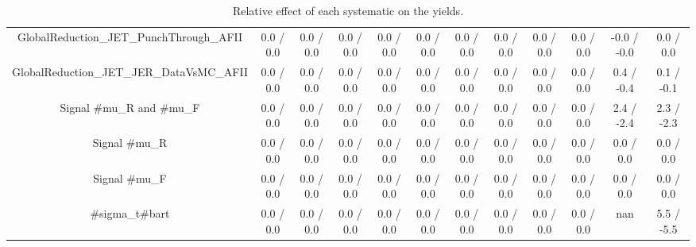 \begin{table}[htbp]
\begin{center}
\begin{tabular}{|c|c|c|c|c|c|c|c|c|c|c|c|}
  GlobalReduction_JET_PunchThrough_AFII & 0.0 / 0.0 & 0.0 / 0.0 & 0.0 / 0.0 & 0.0 / 0.0 & 0.0 / 0.0 & 0.0 / 0.0 & 0.0 / 0.0 & 0.0 / 0.0 & 0.0 / 0.0 & -0.0 / -0.0 & 0.0 / 0.0 \\ 
  GlobalReduction_JET_JER_DataVsMC_AFII & 0.0 / 0.0 & 0.0 / 0.0 & 0.0 / 0.0 & 0.0 / 0.0 & 0.0 / 0.0 & 0.0 / 0.0 & 0.0 / 0.0 & 0.0 / 0.0 & 0.0 / 0.0 & 0.4 / -0.4 & 0.1 / -0.1 \\ 
  Signal #mu_{R} and #mu_{F} & 0.0 / 0.0 & 0.0 / 0.0 & 0.0 / 0.0 & 0.0 / 0.0 & 0.0 / 0.0 & 0.0 / 0.0 & 0.0 / 0.0 & 0.0 / 0.0 & 0.0 / 0.0 & 2.4 / -2.4 & 2.3 / -2.3 \\ 
  Signal #mu_{R} & 0.0 / 0.0 & 0.0 / 0.0 & 0.0 / 0.0 & 0.0 / 0.0 & 0.0 / 0.0 & 0.0 / 0.0 & 0.0 / 0.0 & 0.0 / 0.0 & 0.0 / 0.0 & 0.0 / 0.0 & 0.0 / 0.0 \\ 
  Signal #mu_{F} & 0.0 / 0.0 & 0.0 / 0.0 & 0.0 / 0.0 & 0.0 / 0.0 & 0.0 / 0.0 & 0.0 / 0.0 & 0.0 / 0.0 & 0.0 / 0.0 & 0.0 / 0.0 & 0.0 / 0.0 & 0.0 / 0.0 \\ 
  #sigma_{t#bar{t}} & 0.0 / 0.0 & 0.0 / 0.0 & 0.0 / 0.0 & 0.0 / 0.0 & 0.0 / 0.0 & 0.0 / 0.0 & 0.0 / 0.0 & 0.0 / 0.0 & 0.0 / 0.0 &    nan    & 5.5 / -5.5 \\ 
\hline 
\end{tabular} 
\caption{Relative effect of each systematic on the yields.} 
\end{center} 
\end{table} 
